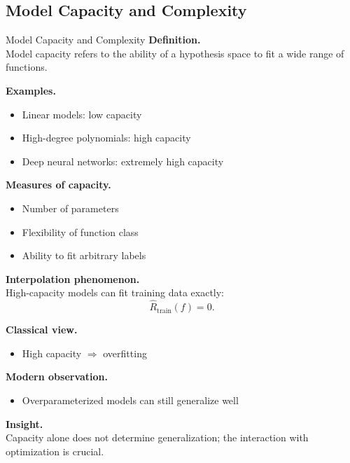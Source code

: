 \documentclass[aspectratio=169,11pt]{beamer}
\begin{document}
\subsection{Model Capacity and Complexity}
\begin{frame}[t,allowframebreaks]{Model Capacity and Complexity}
\small
\textbf{Definition.}\\ Model capacity refers to the ability of a hypothesis space to fit a wide range of functions.

\textbf{Examples.}\\ \begin{itemize}
    \item Linear models: low capacity
    \item High-degree polynomials: high capacity
    \item Deep neural networks: extremely high capacity
\end{itemize}

\textbf{Measures of capacity.}\\ \begin{itemize}
    \item Number of parameters
    \item Flexibility of function class
    \item Ability to fit arbitrary labels
\end{itemize}

\textbf{Interpolation phenomenon.}\\ High-capacity models can fit training data exactly:
\[
\hat{R}_{\text{train}}(f) = 0.
\]

\textbf{Classical view.}\\ \begin{itemize}
    \item High capacity $\Rightarrow$ overfitting
\end{itemize}

\textbf{Modern observation.}\\ \begin{itemize}
    \item Overparameterized models can still generalize well
\end{itemize}

\textbf{Insight.}\\ Capacity alone does not determine generalization; the interaction with optimization is crucial.
\end{frame}
\end{document}
